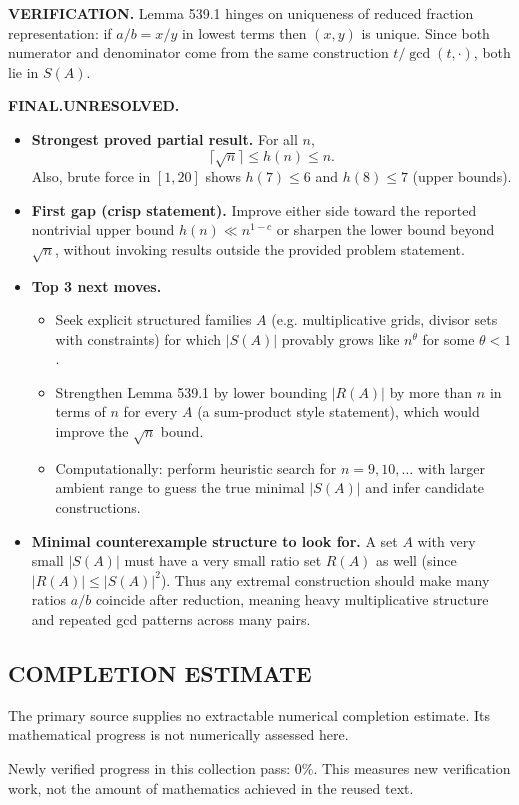 \noindent\textbf{VERIFICATION.}
Lemma 539.1 hinges on uniqueness of reduced fraction representation: if $a/b=x/y$ in lowest terms then $(x,y)$ is unique. Since both numerator and denominator come from the same construction $t/\gcd(t,\cdot)$, both lie in $S(A)$.

\noindent\textbf{FINAL.}\;\textbf{UNRESOLVED.}
\begin{itemize}
\item[(i)] \textbf{Strongest proved partial result.} For all $n$,
\[\lceil\sqrt n\rceil\le h(n)\le n.\]
Also, brute force in $[1,20]$ shows $h(7)\le 6$ and $h(8)\le 7$ (upper bounds).
\item[(ii)] \textbf{First gap (crisp statement).} Improve either side toward the reported nontrivial upper bound $h(n)\ll n^{1-c}$ or sharpen the lower bound beyond $\sqrt n$, without invoking results outside the provided problem statement.
\item[(iii)] \textbf{Top 3 next moves.}
  \begin{itemize}
  \item Seek explicit structured families $A$ (e.g. multiplicative grids, divisor sets with constraints) for which $|S(A)|$ provably grows like $n^\theta$ for some $\theta<1$.
  \item Strengthen Lemma 539.1 by lower bounding $|R(A)|$ by more than $n$ in terms of $n$ for every $A$ (a sum-product style statement), which would improve the $\sqrt n$ bound.
  \item Computationally: perform heuristic search for $n=9,10,\dots$ with larger ambient range to guess the true minimal $|S(A)|$ and infer candidate constructions.
  \end{itemize}
\item[(iv)] \textbf{Minimal counterexample structure to look for.} A set $A$ with very small $|S(A)|$ must have a very small ratio set $R(A)$ as well (since $|R(A)|\le |S(A)|^2$). Thus any extremal construction should make many ratios $a/b$ coincide after reduction, meaning heavy multiplicative structure and repeated gcd patterns across many pairs.
\end{itemize}




\subsection*{COMPLETION ESTIMATE}
The primary source supplies no extractable numerical completion estimate. Its mathematical progress is not numerically assessed here.

Newly verified progress in this collection pass: $0\%$. This measures new verification work, not the amount of mathematics achieved in the reused text.
